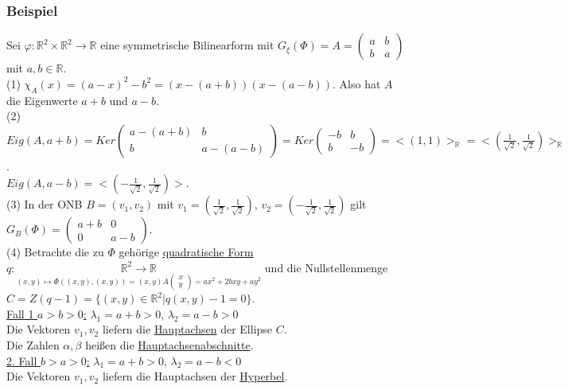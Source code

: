 \documentclass[a4paper]{article}
\newcommand{\ul}{\underline}
\let\phi\varphi
\begin{document}
\subsubsection{Beispiel}
Sei \(\phi:\mathbb{R}^2\times\mathbb{R}^2\rightarrow\mathbb{R}\) eine symmetrische Bilinearform mit \(G_\xi(\Phi)=A=\begin{pmatrix}
a & b\\
b & a
\end{pmatrix}\) mit \(a,b\in\mathbb{R}\).\\
(1) \(\chi_A(x)=(a-x)^2-b^2=(x-(a+b))(x-(a-b))\). Also hat \(A\) die Eigenwerte \(a+b\) und \(a-b\).\\
(2) \(Eig(A,a+b)=Ker\begin{pmatrix}
a-(a+b) & b\\
b & a-(a-b)
\end{pmatrix}=Ker\begin{pmatrix}
-b & b\\
b & -b
\end{pmatrix}=<(1,1)>_\mathbb{R}=<(\frac{1}{\sqrt{2}},\frac{1}{\sqrt{2}})>_\mathbb{R}\).\\
\(Eig(A,a-b)=<(-\frac{1}{\sqrt{2}},\frac{1}{\sqrt{2}})>\).\\
(3) In der ONB \(B=(v_1,v_2)\) mit \(v_1=(\frac{1}{\sqrt{2}},\frac{1}{\sqrt{2}})\), \(v_2=(-\frac{1}{\sqrt{2}},\frac{1}{\sqrt{2}})\) gilt \(G_B(\Phi)=\begin{pmatrix}
a+b & 0\\
0 & a-b
\end{pmatrix}\).\\
(4) Betrachte die zu \(\Phi\) gehörige \ul{quadratische Form} \(q:\underset{(x,y)\mapsto\Phi((x,y),(x,y))=(x,y)A\begin{pmatrix}
x\\y
\end{pmatrix}=ax^2+2bxy+ay^2}{\mathbb{R}^2\rightarrow\mathbb{R}}\) und die Nullstellenmenge \(C=Z(q-1)=\{(x,y)\in\mathbb{R}^2|q(x,y)-1=0\}\).\\
\ul{Fall 1 \(a>b>0\):} \(\lambda_1=a+b>0\), \(\lambda_2=a-b>0\)\\
Die Vektoren \(v_1,v_2\) liefern die \ul{Hauptachsen} der Ellipse \(C\).\\
Die Zahlen \(\alpha,\beta\) heißen die \ul{Hauptachsenabschnitte}.\\
\ul{2. Fall \(b>a>0\):} \(\lambda_1=a+b>0\), \(\lambda_2=a-b<0\)\\
Die Vektoren \(v_1,v_2\) liefern die Hauptachsen der \ul{Hyperbel}.\\
\end{document}
